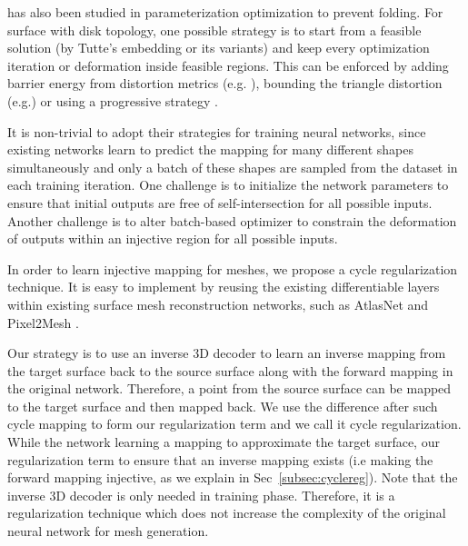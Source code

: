  has also been studied in parameterization optimization to prevent folding. For surface with disk topology, one possible strategy is to start from a feasible solution (by Tutte's embedding \cite{tutte} or its variants) and keep every optimization iteration or deformation inside feasible regions. This can be enforced by adding barrier energy from distortion metrics (e.g. \cite{provableplanarmapping,lifted_bijection}), bounding the triangle distortion (e.g.\cite{freeboundary,boundeddistortion})
or using a progressive strategy \cite{Liu_PP_2018}.

It is non-trivial to adopt their strategies for training neural networks, since existing networks learn to predict the mapping for many different shapes simultaneously and only a batch of these shapes are sampled from the dataset in each training iteration. One challenge is to initialize the network parameters to ensure that initial outputs are free of self-intersection for all possible inputs. Another challenge is to alter batch-based optimizer to constrain the deformation of outputs within an injective region for all possible inputs. 

In order to learn injective mapping for meshes, we propose a cycle regularization technique.  It is easy to implement by reusing the existing differentiable layers within existing surface mesh reconstruction networks, such as AtlasNet \cite{atlasnet} and Pixel2Mesh \cite{pixel2mesh}.

 Our strategy is to use an inverse 3D decoder to learn an inverse mapping from  the target surface back to the source surface along with the forward mapping in the original network. Therefore, a point from the source surface can be mapped to the target surface and then mapped back. We use the difference after such cycle mapping to form our regularization term and we call it cycle regularization. While the network learning a mapping to approximate the target surface, our regularization term  to ensure that an inverse mapping exists (i.e making the forward mapping injective, as we explain in Sec~\ref{subsec:cyclereg}).
Note that the inverse 3D decoder is only needed in training phase. Therefore, it is a regularization technique which does not increase the complexity of the original neural network for mesh generation.

